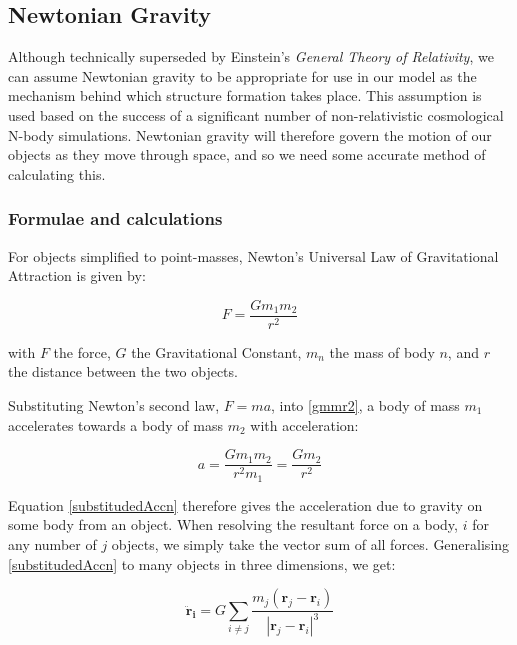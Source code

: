 \documentclass[11pt,a4paper]{article}
\begin{document}
\subsection{Newtonian Gravity}
\label{newtonGravity}

Although technically superseded by Einstein's \emph{General Theory of Relativity}, we can assume Newtonian gravity to be appropriate for use in our model as the mechanism behind which structure formation takes place. This assumption is used based on the success of a significant number of non-relativistic cosmological N-body simulations. Newtonian gravity will therefore govern the motion of our objects as they move through space, and so we need some accurate method of calculating this.

\subsubsection{Formulae and calculations} 

For objects simplified to point-masses, Newton's Universal Law of Gravitational Attraction is given by:

\begin{center}
\begin{equation}
F=\frac{Gm_{1}m_{2}}{r^2} 
\label{gmmr2}
\end{equation}
\end{center}

\noindent with $F$ the force, $G$ the Gravitational Constant, $m_{n}$ the mass of body $n$, and $r$ the distance between the two objects. 

\noindent Substituting Newton's second law, $F=ma$, into \ref{gmmr2}, a body of mass $m_{1}$ accelerates towards a body of mass $m_{2}$ with acceleration:
\begin{center}
\begin{equation}
a=\frac{Gm_{1}m_{2}}{r^2m_{1}} = \frac{Gm_{2}}{r^2}
\label{substitudedAccn}
\end{equation}
\end{center}

Equation \noindent \ref{substitudedAccn} therefore gives the acceleration due to gravity on some body from an object. When resolving the resultant force on a body, $i$ for any number of $j$ objects, we simply take the vector sum of all forces. Generalising \ref{substitudedAccn} to many objects in three dimensions, we get:

\begin{center}
\begin{equation}
\mathbf{\ddot r_{i}}=G\sum_{i\neq j}\frac{m_{j}(\mathbf r_{j}-\mathbf r_{i})}{|\mathbf r_{j}-\mathbf r_{i}|^3}
\label{accnFinal}
\end{equation}
\end{center}
\end{document}
